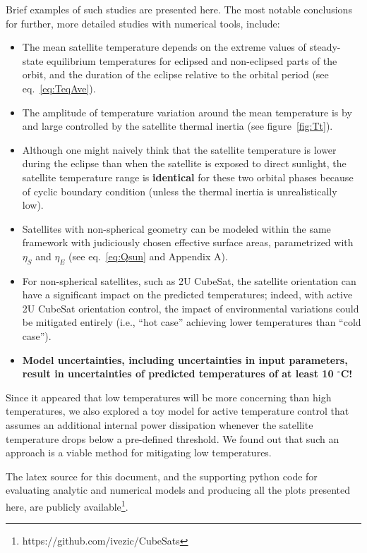 \documentclass[]{aastex62}
\begin{document}
Brief examples of such studies are presented here. The most notable conclusions for further,
more detailed studies with numerical tools, include:
\begin{itemize}
\item The mean satellite temperature depends on the extreme values of steady-state equilibrium 
    temperatures for eclipsed and non-eclipsed parts of the orbit, and the duration of the eclipse
    relative to the orbital period (see eq.~\ref{eq:TeqAve}). 
\item The amplitude of temperature variation around the mean temperature is by and large 
     controlled by the satellite thermal inertia (see figure~\ref{fig:Tt}).
\item Although one might naively think that the satellite temperature is lower during the eclipse
    than when the satellite is exposed to direct sunlight, the satellite temperature range is {\bf identical} 
    for these two orbital phases because of cyclic boundary condition (unless the thermal inertia 
    is unrealistically low). 
\item Satellites with non-spherical geometry can be modeled within the same framework with 
    judiciously chosen effective surface areas, parametrized with $\eta_S$ and $\eta_E$
    (see eq.~\ref{eq:Qsun} and Appendix A). 
\item For non-spherical satellites, such as 2U CubeSat, the satellite orientation can have a
    significant impact on the predicted temperatures; indeed, with active 2U CubeSat orientation 
    control, the impact of environmental variations could be mitigated entirely (i.e., ``hot case'' 
    achieving lower temperatures than ``cold case''). 
\item {\bf Model uncertainties, including uncertainties in input parameters, result in uncertainties
   of predicted temperatures of at least 10 $^\circ$C!} 
\end{itemize} 

Since it appeared that low temperatures will be more concerning than high temperatures,
we also explored a toy model for active temperature control that assumes an additional internal 
power dissipation whenever the satellite temperature drops below a pre-defined threshold. 
We found out that such an approach is a viable method for mitigating low temperatures.

The latex source for this document, and the supporting python code for evaluating analytic and
numerical models and producing all the plots presented here, are publicly available\footnote{https://github.com/ivezic/CubeSats}. 
\end{document}
